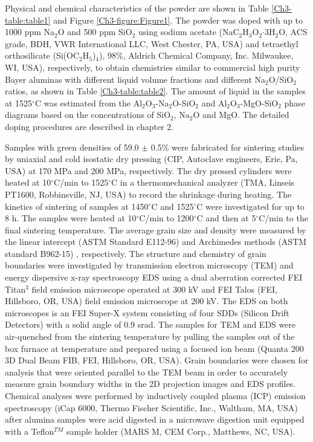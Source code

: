 Physical and chemical characteristics of the powder are shown in Table \ref{Ch3-table:table1} and Figure \ref{Ch3-figure:Figure1}. The powder was doped with up to 1000 ppm Na$_{2}$O and 500 ppm SiO$_{2}$ using sodium acetate (NaC$_{2}$H$_{3}$O$_{2}$$\cdot$3H$_{2}$O, ACS grade, BDH, VWR International LLC, West Chester, PA, USA) and tetraethyl orthosilicate (Si(OC$_{2}$H$_{5}$)$_{4}$), 98\%, Aldrich Chemical Company, Inc. Milwaukee, WI, USA), respectively, to obtain chemistries similar to commercial high purity Bayer aluminas with different liquid volume fractions and different Na$_{2}$O/SiO$_{2}$ ratios, as shown in Table \ref{Ch3-table:table2}. The amount of liquid in the samples at 1525$^{\circ}$C was estimated from the Al$_{2}$O$_{3}$-Na$_{2}$O-SiO$_{2}$ and Al$_{2}$O$_{3}$-MgO-SiO$_{2}$ phase diagrams \cite{Frueh2016a,Mao2005,Lambotte2013a} based on the concentrations of SiO$_{2}$, Na$_{2}$O and MgO. The detailed doping procedures are described in chapter 2. 

Samples with green densities of 59.0 $\pm$ 0.5\% were fabricated for sintering studies by uniaxial and cold isostatic dry pressing (CIP, Autoclave engineers, Erie, Pa, USA) at 170 MPa and 200 MPa, respectively. The dry pressed cylinders were heated at 10$^{\circ}$C/min to 1525$^{\circ}$C in a thermomechanical analyzer (TMA, Linseis PT1600, Robbinsville, NJ, USA) to record the shrinkage during heating. The kinetics of sintering of samples at 1450$^{\circ}$C and 1525$^{\circ}$C were investigated for up to 8 h. The samples were heated at 10$^{\circ}$C/min to 1200$^{\circ}$C and then at 5$^{\circ}$C/min to the final sintering temperature. The average grain size and density were measured by the linear intercept (ASTM Standard E112-96) \cite{Standard2013} and Archimedes methods (ASTM standard B962-15) \cite{Standard2015}, respectively. The structure and chemistry of grain boundaries were investigated by transmission electron microscopy (TEM) and energy dispersive x-ray spectroscopy EDS using a dual aberration corrected FEI Titan$^{3}$ field emission microscope operated at 300 kV and FEI Talos (FEI, Hillsboro, OR, USA) field emission microscope at 200 kV. The EDS on both microscopes is an FEI Super-X system consisting of four SDDs (Silicon Drift Detectors) with a solid angle of 0.9 srad. The samples for TEM and EDS were air-quenched from the sintering temperature by pulling the samples out of the box furnace at temperature and prepared using a focused ion beam (Quanta 200 3D Dual Beam FIB, FEI, Hillsboro, OR, USA). Grain boundaries were chosen for analysis that were oriented parallel to the TEM beam in order to accurately measure grain boundary widths in the 2D projection images and EDS profiles. Chemical analyses were performed by inductively coupled plasma (ICP) emission spectroscopy (iCap 6000, Thermo Fischer Scientific, Inc., Waltham, MA, USA) after alumina samples were acid digested in a microwave digestion unit equipped with a Teflon$^{TM}$ sample holder (MARS M, CEM Corp., Matthews, NC, USA).

